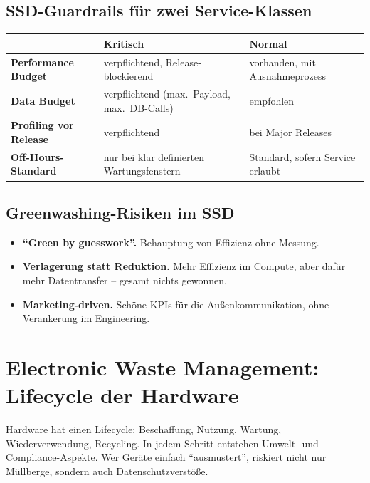 \documentclass[11pt,a4paper,oneside]{article}
\newcommand{\quelle}[1]{{\footnotesize\color{lpGray}(#1)}}
\begin{document}
\subsection{SSD-Guardrails für zwei Service-Klassen}

\begin{tabularx}{\linewidth}{@{}>{\bfseries}lXX@{}}
\toprule
& \textbf{Kritisch} & \textbf{Normal} \\
\midrule
Performance Budget & verpflichtend, Release-blockierend & vorhanden, mit Ausnahmeprozess \\
Data Budget & verpflichtend (max.\ Payload, max.\ DB-Calls) & empfohlen \\
Profiling vor Release & verpflichtend & bei Major Releases \\
Off-Hours-Standard & nur bei klar definierten Wartungsfenstern & Standard, sofern Service erlaubt \\
\bottomrule
\end{tabularx}

\medskip

\noindent \quelle{vgl.\ Murugesan, 2008}

\subsection{Greenwashing-Risiken im SSD}

\begin{itemize}
  \item \textbf{``Green by guesswork''.} Behauptung von Effizienz ohne Messung.
  \item \textbf{Verlagerung statt Reduktion.} Mehr Effizienz im Compute, aber dafür mehr Datentransfer -- gesamt nichts gewonnen.
  \item \textbf{Marketing-driven.} Schöne KPIs für die Außenkommunikation, ohne Verankerung im Engineering.
\end{itemize}

\section{Electronic Waste Management: Lifecycle der Hardware}

Hardware hat einen Lifecycle: Beschaffung, Nutzung, Wartung, Wiederverwendung, Recycling. In jedem Schritt entstehen Umwelt- und Compliance-Aspekte. Wer Geräte einfach ``ausmustert'', riskiert nicht nur Müllberge, sondern auch Datenschutzverstöße.
\end{document}
